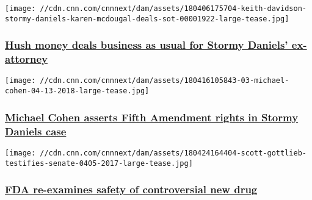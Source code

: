 \href{/2018/04/27/politics/stormy-daniels-attorney-hush-agreements-invs/index.html}{}

\texttt{[image: //cdn.cnn.com/cnnnext/dam/assets/180406175704-keith-davidson-stormy-daniels-karen-mcdougal-deals-sot-00001922-large-tease.jpg]}

\hypertarget{hush-money-deals-business-as-usual-for-stormy-daniels-ex-attorney}{%
\subsubsection{\texorpdfstring{\href{/2018/04/27/politics/stormy-daniels-attorney-hush-agreements-invs/index.html}{Hush
money deals business as usual for Stormy Daniels'
ex-attorney}}{Hush money deals business as usual for Stormy Daniels' ex-attorney}}\label{hush-money-deals-business-as-usual-for-stormy-daniels-ex-attorney}}

\href{/2018/04/25/politics/michael-cohen-fifth-amendment/index.html}{}

\texttt{[image: //cdn.cnn.com/cnnnext/dam/assets/180416105843-03-michael-cohen-04-13-2018-large-tease.jpg]}

\hypertarget{michael-cohen-asserts-fifth-amendment-rights-in-stormy-daniels-case}{%
\subsubsection{\texorpdfstring{\href{/2018/04/25/politics/michael-cohen-fifth-amendment/index.html}{Michael
Cohen asserts Fifth Amendment rights in Stormy Daniels
case}}{Michael Cohen asserts Fifth Amendment rights in Stormy Daniels case}}\label{michael-cohen-asserts-fifth-amendment-rights-in-stormy-daniels-case}}

\href{/2018/04/25/health/fda-nuplazid-safety-evaluation-invs/index.html}{}

\texttt{[image: //cdn.cnn.com/cnnnext/dam/assets/180424164404-scott-gottlieb-testifies-senate-0405-2017-large-tease.jpg]}

\hypertarget{fda-re-examines-safety-of-controversial-new-drug}{%
\subsubsection{\texorpdfstring{\href{/2018/04/25/health/fda-nuplazid-safety-evaluation-invs/index.html}{FDA
re-examines safety of controversial new
drug}}{FDA re-examines safety of controversial new drug}}\label{fda-re-examines-safety-of-controversial-new-drug}}

\href{/2018/04/20/politics/stormy-daniels-donald-trump-michael-cohen-court/index.html}{}

